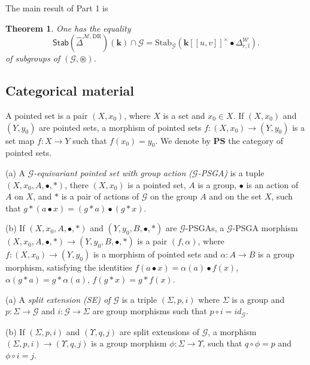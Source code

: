 \documentclass[10pt]{amsart}
\newcommand{\DR}{\mathrm{DR}}
\newtheorem{thm}{Theorem}[section]
\numberwithin{equation}{subsection}
\begin{document}
The main result of Part 1 is
\begin{thm}\label{thm:main}
One has the equality 
\begin{equation*}%
\mathsf{Stab}(\hat\Delta^{\mathcal M,\DR})(\mathbf k)\cap \mathcal G
=\mathrm{Stab}_{\mathcal G}(
\mathbf k[[u,v]]^\times\bullet\Delta^{\mathcal W}_{r,l}
). 
\end{equation*}
of subgroups of $(\mathcal G,\circledast)$. 
\end{thm}

\subsection{Categorical material}\label{sect:1:2}

\begin{defn}
A pointed set is a pair $(X,x_0)$, where $X$ is a set and $x_0\in X$. If $(X,x_0)$ and $(Y,y_0)$ are pointed sets, a morphism 
of pointed sets $f : (X,x_0)\to (Y,y_0)$ is a set map $f : X\to Y$ such that $f(x_0)=y_0$. We denote by $\mathbf{PS}$ the category of pointed 
sets.  
\end{defn}

\begin{defn}\label{def:psga}
(a) A {\it $\mathcal G$-equivariant pointed set with group action ($\mathcal G$-PSGA)} is a tuple $(X,x_0,A,\bullet,*)$, 
there $(X,x_0)$ is a pointed set, $A$ is a group, 
$\bullet$ is an action of $A$ on $X$, and $*$ is a pair of actions of $\mathcal G$ on the group 
$A$ and on the set $X$, such that $g*(a\bullet x)=(g*a)\bullet(g*x)$. 

(b) If $(X,x_0,A,\bullet,*)$ and  $(Y,y_0,B,\bullet,*)$ are $\mathcal G$-PSGAs, a $\mathcal G$-PSGA morphism 
$(X,x_0,A,\bullet,*)\to(Y,y_0,B,\bullet,*)$
 is a pair $(f,\alpha)$, where $f : (X,x_0)\to(Y,y_0)$ is a morphism of pointed sets and $\alpha : A\to B$ is a group morphism, satisfying the identities
 $f(a\bullet x)=\alpha(a)\bullet f(x)$, $\alpha(g*a)=g*\alpha(a)$, $f(g*x)=g*f(x)$. 
\end{defn}

\begin{defn}
(a) A {\it split extension (SE) of $\mathcal G$} is a triple $(\Sigma,p,i)$ where $\Sigma$ is a group and 
$p : \Sigma\to\mathcal G$ and $i : \mathcal G\to \Sigma$ are group morphisms such that 
$p\circ i=id_{\mathcal G}$. 

(b) If $(\Sigma,p,i)$ and $(\Upsilon,q,j)$ are split extensions of $\mathcal G$, a morphism 
$(\Sigma,p,i)\to(\Upsilon,q,j)$ is a group morphism $\phi : \Sigma\to\Upsilon$, such that 
$q\circ\phi=p$ and $\phi\circ i=j$. 
\end{defn}
\end{document}
